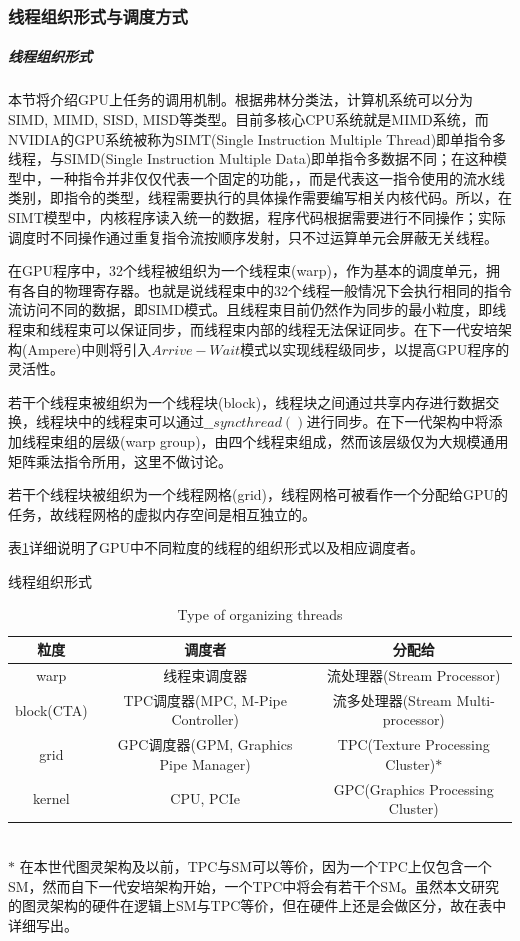 \subsubsection{线程组织形式与调度方式}
\subparagraph{线程组织形式}
\par 本节将介绍GPU上任务的调用机制。根据弗林分类法\cite{FLYNN}，计算机系统可以分为SIMD, MIMD, SISD, MISD等类型。目前多核心CPU系统就是MIMD系统，而NVIDIA的GPU系统被称为SIMT(Single Instruction Multiple Thread)即单指令多线程，与SIMD(Single Instruction Multiple Data)即单指令多数据不同；在这种模型中，一种指令并非仅仅代表一个固定的功能，，而是代表这一指令使用的流水线类别，即指令的类型，线程需要执行的具体操作需要编写相关内核代码。所以，在SIMT模型中，内核程序读入统一的数据，程序代码根据需要进行不同操作；实际调度时不同操作通过重复指令流按顺序发射，只不过运算单元会屏蔽无关线程。
\par 在GPU程序中，32个线程被组织为一个线程束(warp)，作为基本的调度单元，拥有各自的物理寄存器。也就是说线程束中的32个线程一般情况下会执行相同的指令流访问不同的数据，即SIMD模式。且线程束目前仍然作为同步的最小粒度，即线程束和线程束可以保证同步，而线程束内部的线程无法保证同步。在下一代安培架构(Ampere)中则将引入$ Arrive-Wait $模式以实现线程级同步，以提高GPU程序的灵活性。
\par 若干个线程束被组织为一个线程块(block)，线程块之间通过共享内存进行数据交换，线程块中的线程束可以通过$ \_\_syncthread() $进行同步。在下一代架构中将添加线程束组的层级(warp group)，由四个线程束组成，然而该层级仅为大规模通用矩阵乘法指令所用，这里不做讨论。
\par 若干个线程块被组织为一个线程网格(grid)，线程网格可被看作一个分配给GPU的任务，故线程网格的虚拟内存空间是相互独立的。
\par 表\ref{table-粒度}详细说明了GPU中不同粒度的线程的组织形式以及相应调度者。
\begin{table}
	\centering
	\renewcommand{\thetable}{\arabic{section}-\arabic{table} }
	\renewcommand{\tablename}{表}
	\caption{线程组织形式}
	\addtocounter{table}{-1}
	\renewcommand{\thetable}{\arabic{section}-\arabic{table} }
	\renewcommand{\tablename}{Table}
	\caption{Type of organizing threads}
	\begin{tabular}{ccc}
		\toprule
		粒度	&	调度者	& 	分配给 \\
		\midrule
		warp		&	线程束调度器	&	流处理器(Stream Processor)\\
		block(CTA)	&	TPC调度器(MPC, M-Pipe Controller)		  &		流多处理器(Stream Multi-processor)\\
		grid		&	GPC调度器(GPM, Graphics Pipe Manager)		  &		TPC(Texture Processing Cluster)$ * $\\
		kernel		&	CPU, PCIe			&		GPC(Graphics Processing Cluster)	\\	
		\bottomrule
	\end{tabular} \label{table-粒度}\\
	
	$ * $ 在本世代图灵架构及以前，TPC与SM可以等价，因为一个TPC上仅包含一个SM，然而自下一代安培架构开始，一个TPC中将会有若干个SM。虽然本文研究的图灵架构的硬件在逻辑上SM与TPC等价，但在硬件上还是会做区分，故在表中详细写出\cite{BLOCKDIAG}。
\end{table}

